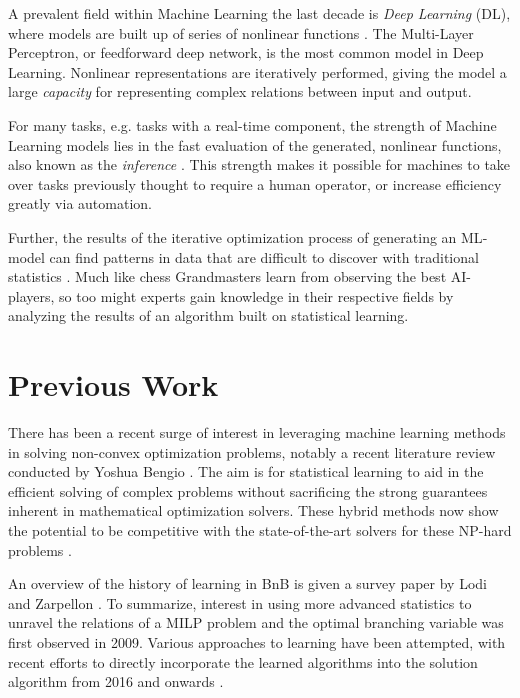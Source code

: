 A prevalent field within Machine Learning the last decade is \textit{Deep Learning} (DL), where models are built up of series of nonlinear functions \cite{goodfellow2016deep}. 
The Multi-Layer Perceptron, or feedforward deep network, is the most common model in Deep Learning. Nonlinear representations are iteratively performed, giving the model a large \textit{capacity} for representing complex relations between input and output. 

For many tasks, e.g. tasks with a real-time component, the strength of Machine Learning models lies in the fast evaluation of the generated, nonlinear functions, also known as the \textit{inference} \cite{bertsimas2019online}. This strength makes it possible for machines to take over tasks previously thought to require a human operator, or increase efficiency greatly via automation.

Further, the results of the iterative optimization process of generating an \gls{ML}-model can find patterns in data that are difficult to discover with traditional statistics \cite{goodfellow2016deep}. Much like chess Grandmasters learn from observing the best AI-players, so too might experts gain knowledge in their respective fields by analyzing the results of an algorithm built on statistical learning.  


\section{Previous Work}

There has been a recent surge of interest in leveraging machine learning methods in solving non-convex optimization problems, notably a recent literature review conducted by Yoshua Bengio \cite{bengio2020machine}. The aim is for statistical learning to aid in the efficient solving of complex problems without sacrificing the strong guarantees inherent in mathematical optimization solvers. These hybrid methods now show the potential to be competitive with the state-of-the-art solvers for these NP-hard problems \cite{gasse2019exact}. 

An overview of the history of learning in \gls{BnB} is given a survey paper by Lodi and Zarpellon \cite{lodi2017learning}. To summarize, interest in using more advanced statistics to unravel the relations of a \gls{MILP} problem and the optimal branching variable was first observed in 2009. Various approaches to learning have been attempted, with recent efforts to directly incorporate the learned algorithms into the solution algorithm from 2016 and onwards \cite{lodi2017learning}.  

